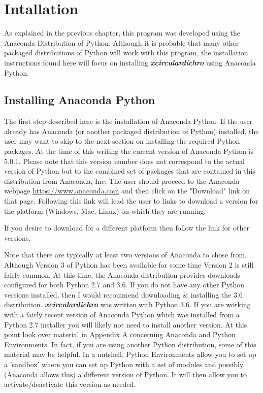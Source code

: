 \documentclass[12pt,letterpaper, openany]{book}
\begin{document}
 
\chapter{Intallation}\label{chap:installation}
As explained in the previous chapter, this program was developed using the
Anaconda Distribution of Python.  Although it is probable that many other
packaged distributions of Python will work with this program, the installation
instructions found here will focus on installing
\textbf{\textit{xcirculardichro}} using Anaconda Python.

\section{Installing Anaconda Python}\label{sec:installingAnaconda}
The first step described here is the installation of Anaconda Python.  If the
user already has Anaconda (or another packaged distribution of Python)
installed, the user may want to skip to the next section on installing the
required Python packages.
At the time of this writing the current version of Anaconda Python is 5.0.1. 
Please note that this version number does not correspond to the actual version
of Python but to the combined set of packages that are contained in this
distribution from Anaconda, Inc.  The user should proceed to the Anaconda
webpage \url{https://www.anaconda.com} and then click on the "Download" link on
that page.  Following this link will lead the user to links to download a
version for the platform (Windows, Mac, Linux) on which they are running.
\newline
\vspace{3mm}


  {
   \begin{minipage}{5.0in}
      If you desire to download for a different platform then follow the link
      for other versions.
   \end{minipage}}

\vspace{3mm}

\noindent Note that there are typically at least two versions of Anaconda to
chose from.  Although Version 3 of Python has been available for some time
Version 2 is still fairly common.  At this time, the Anaconda distribution
provides downloads configured for both Python 2.7 and 3.6.  If you do not have
any other Python versions installed, then I would recommend downloading \&
installing the 3.6 distribution.  \textbf{\textit{xcirculardichro}} was written
with Python 3.6.
If you are working with a fairly recent version of Anaconda Python which was
installed from a Python 2.7 installer you will likely not need to install
another version.  At this point look over material in Appendix A concerning
Anaconda and Python Environments.  In fact, if you are using another Python
distribution, some of this material may be helpful.  In a nutshell, Python
Environments allow you to set up a 'sandbox' where you can set up Python with a
set of modules and possibly (Anaconda allows this) a different version of
Python.  It will then allow you to activate/deactivate this version as needed.
\end{document}
